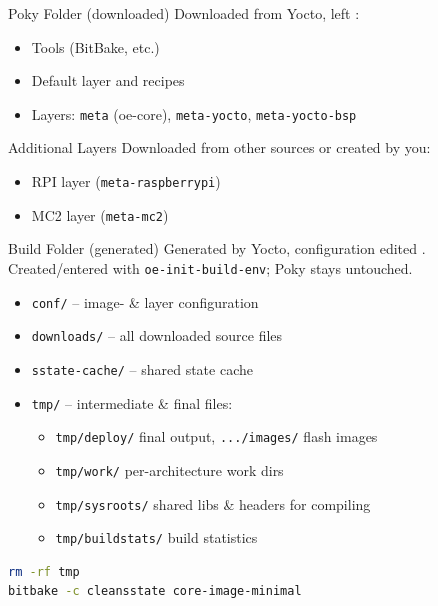 
\begin{definition}{Poky Folder (downloaded)}
    Downloaded from Yocto, left :
    \begin{itemize}
        \item Tools (BitBake, etc.)
        \item Default layer and recipes
        \item Layers: \texttt{meta} (oe-core), \texttt{meta-yocto},
              \texttt{meta-yocto-bsp}
    \end{itemize}
\end{definition}

\begin{definition}{Additional Layers}
    Downloaded from other sources or created by you:
    \begin{itemize}
        \item RPI layer (\texttt{meta-raspberrypi})
        \item MC2 layer (\texttt{meta-mc2})
    \end{itemize}
\end{definition}

\multend

\begin{definition}{Build Folder (generated)}
    Generated by Yocto, configuration edited .
    Created/entered with \texttt{oe-init-build-env}; Poky stays untouched.
    \begin{itemize}
        \item \texttt{conf/} -- image- \& layer configuration
        \item \texttt{downloads/} -- all downloaded source files
        \item \texttt{sstate-cache/} -- shared state cache
        \item \texttt{tmp/} -- intermediate \& final files:
        \begin{itemize}
            \item \texttt{tmp/deploy/} final output, \texttt{.../images/} flash images
            \item \texttt{tmp/work/} per-architecture work dirs
            \item \texttt{tmp/sysroots/} shared libs \& headers for compiling
            \item \texttt{tmp/buildstats/} build statistics
        \end{itemize}
    \end{itemize}
\begin{lstlisting}[language=bash, style=basesmol, aboveskip=2pt, belowskip=2pt]
rm -rf tmp
bitbake -c cleansstate core-image-minimal
\end{lstlisting}
\end{definition}

